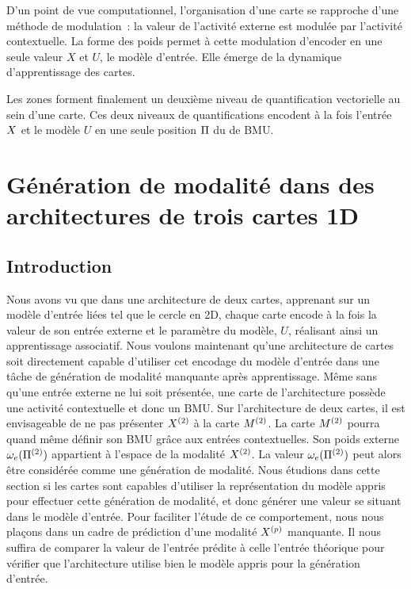 \documentclass[../main]{subfiles}
\begin{document}
D'un point de vue computationnel, l'organisation d'une carte se rapproche d'une méthode de modulation~: la valeur de l'activité externe est modulée par l'activité contextuelle. 
La forme des poids permet à cette modulation d'encoder en une seule valeur $X$ et $U$, le modèle d'entrée. Elle émerge de la dynamique d'apprentissage des cartes.

Les zones forment finalement un deuxième niveau de quantification vectorielle au sein d'une carte. 
Ces deux niveaux de quantifications encodent à la fois l'entrée $X$ et le modèle $U$ en une seule position $\Pi$ du de BMU.

\section{Génération de modalité dans des architectures de trois cartes 1D}

\subsection{Introduction}

Nous avons vu que dans une architecture de deux cartes, apprenant sur un modèle d'entrée liées tel que le cercle en 2D, chaque carte encode à la fois la valeur de son entrée externe et le paramètre du modèle, $U$, réalisant ainsi un apprentissage associatif. 
Nous voulons maintenant qu'une architecture de cartes soit directement capable d'utiliser cet encodage du modèle d'entrée dans une tâche de génération de modalité manquante après apprentissage.
Même sans qu'une entrée externe ne lui soit présentée, une carte de l'architecture possède une activité contextuelle et donc un BMU. 
Sur l'architecture de deux cartes, il est envisageable de ne pas présenter $X^{({2})}$ à la carte $M^{({2})}$. La carte $M^{({2})}$ pourra quand même définir son BMU grâce aux entrées contextuelles. Son poids externe $\omega_e(\Pi^{({2})})$ appartient à l'espace de la modalité $X^{({2})}$. 
La valeur $\omega_e(\Pi^{({2})})$ peut alors être considérée comme une génération de modalité. 
Nous étudions dans cette section si les cartes sont capables d'utiliser la représentation du modèle appris pour effectuer cette génération de modalité, et donc générer une valeur se situant dans le modèle d'entrée.
Pour faciliter l'étude de ce comportement, nous nous plaçons dans un cadre de prédiction d'une modalité $X^{({p})}$ manquante. Il nous suffira de comparer la valeur de l'entrée prédite à celle l'entrée théorique pour vérifier que l'architecture utilise bien le modèle appris pour la génération d'entrée.
\end{document}

